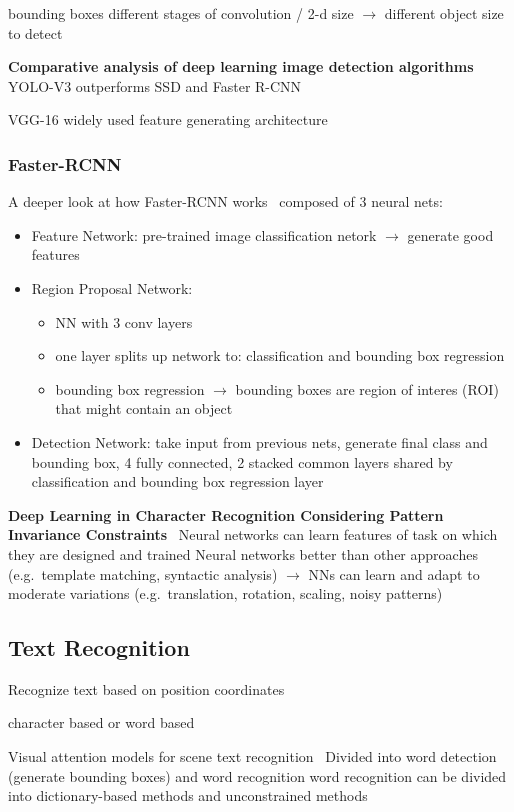 bounding boxes different stages of convolution / 2-d size $\rightarrow$ different object size to detect

\textbf{Comparative analysis of deep learning image detection
algorithms}~\citep{srivastava_comparative_2021}
YOLO-V3 outperforms SSD and Faster R-CNN

VGG-16 widely used feature generating architecture

\subsubsection*{Faster-RCNN}
A deeper look at how Faster-RCNN works~\citep{goswami_deeper_2018}
composed of 3 neural nets:
\begin{itemize}
    \item Feature Network: pre-trained image classification netork $\rightarrow$ generate good features
    \item Region Proposal Network:
        \begin{itemize}
            \item NN with 3 conv layers
            \item one layer splits up network to: classification and bounding box regression
            \item bounding box regression $\rightarrow$ bounding boxes are region of interes (ROI)
                that might contain an object
        \end{itemize}
    \item Detection Network: take input from previous nets, generate final class and bounding box,
        4 fully connected, 2 stacked common layers shared by classification and bounding box regression
        layer \end{itemize}

\textbf{Deep Learning in Character Recognition Considering Pattern Invariance
Constraints}~\citep{oyedotun_deep_2015}
Neural networks can learn features of task on which they are designed and trained
Neural networks better than other approaches (e.g.\ template matching, syntactic analysis)
$\rightarrow$ NNs can learn and adapt to moderate variations (e.g.\ translation, rotation, scaling,
noisy patterns)

\subsection*{Text Recognition}
Recognize text based on position coordinates

character based or word based

Visual attention models for scene text recognition~\citep{ghosh_visual_2017}
Divided into word detection (generate bounding boxes) and word recognition
word recognition can be divided into dictionary-based methods and unconstrained methods
